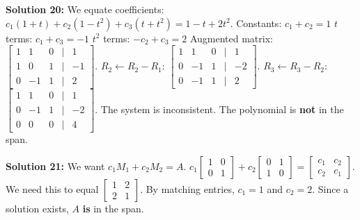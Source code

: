 \documentclass[11pt]{article}
\begin{document}
\vspace{0.3cm}
\textbf{Solution 20:}
We equate coefficients: $c_1(1+t) + c_2(1-t^2) + c_3(t+t^2) = 1 - t + 2t^2$.
Constants: $c_1 + c_2 = 1$
$t$ terms: $c_1 + c_3 = -1$
$t^2$ terms: $-c_2 + c_3 = 2$
Augmented matrix:
$\begin{bmatrix} 1 & 1 & 0 & | & 1 \\ 1 & 0 & 1 & | & -1 \\ 0 & -1 & 1 & | & 2 \end{bmatrix}$.
$R_2 \leftarrow R_2 - R_1$:
$\begin{bmatrix} 1 & 1 & 0 & | & 1 \\ 0 & -1 & 1 & | & -2 \\ 0 & -1 & 1 & | & 2 \end{bmatrix}$.
$R_3 \leftarrow R_3 - R_2$:
$\begin{bmatrix} 1 & 1 & 0 & | & 1 \\ 0 & -1 & 1 & | & -2 \\ 0 & 0 & 0 & | & 4 \end{bmatrix}$.
The system is inconsistent. The polynomial is \textbf{not} in the span.

\vspace{0.3cm}
\textbf{Solution 21:}
We want $c_1 M_1 + c_2 M_2 = A$.
$c_1 \begin{bmatrix} 1 & 0 \\ 0 & 1 \end{bmatrix} + c_2 \begin{bmatrix} 0 & 1 \\ 1 & 0 \end{bmatrix} = \begin{bmatrix} c_1 & c_2 \\ c_2 & c_1 \end{bmatrix}$.
We need this to equal $\begin{bmatrix} 1 & 2 \\ 2 & 1 \end{bmatrix}$.
By matching entries, $c_1 = 1$ and $c_2 = 2$. Since a solution exists, $A$ \textbf{is} in the span.
\end{document}
